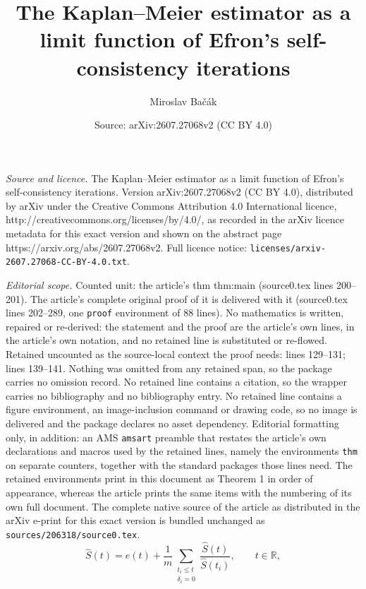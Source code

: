 \documentclass[10pt,a4paper]{amsart}
\title{The Kaplan--Meier estimator as a limit function of Efron's self-consistency iterations}
\author{Miroslav Ba\v{c}\'ak}
\date{Source: arXiv:2607.27068v2 (CC BY 4.0)}
\renewcommand{\hat}{\widehat}
\def\l{\left}
\def\r{\right}
\newcommand{\rec}[1]{\frac{1}{#1}}
\def\rls{\mathbb{R}}
\begin{document}
\maketitle

\noindent\emph{Source and licence.} The Kaplan--Meier estimator as a limit function of Efron's self-consistency iterations. Version arXiv:2607.27068v2 (CC BY 4.0), distributed by arXiv under the Creative Commons Attribution 4.0 International licence, http://creativecommons.org/licenses/by/4.0/, as recorded in the arXiv licence metadata for this exact version and shown on the abstract page https://arxiv.org/abs/2607.27068v2. Full licence notice: \texttt{licenses/arxiv-2607.27068-CC-BY-4.0.txt}.\par\smallskip

\noindent\textit{Editorial scope.} Counted unit: the article's thm thm:main (source0.tex lines 200--201). The article's complete original proof of it is delivered with it (source0.tex lines 202--289, one \texttt{proof} environment of 88 lines). No mathematics is written, repaired or re-derived: the statement and the proof are the article's own lines, in the article's own notation, and no retained line is substituted or re-flowed.  Retained uncounted as the source-local context the proof needs: lines 129--131; lines 139--141.  Nothing was omitted from any retained span, so the package carries no omission record.  No retained line contains a citation, so the wrapper carries no bibliography and no bibliography entry.  No retained line contains a figure environment, an image-inclusion command or drawing code, so no image is delivered and the package declares no asset dependency.  Editorial formatting only, in addition: an AMS \texttt{amsart} preamble that restates the article's own declarations and macros used by the retained lines, namely the environments \texttt{thm} on separate counters, together with the standard packages those lines need.  The retained environments print in this document as Theorem 1 in order of appearance, whereas the article prints the same items with the numbering of its own full document.  The complete native source of the article as distributed in the arXiv e-print for this exact version is bundled unchanged as \texttt{sources/206318/source0.tex}.
\begin{equation} \label{eq:self}
 \hat{S}(t) = e(t) + \rec{m} \sum_{\substack{t_i\le t \\ \delta_i=0}}\frac{\hat{S}(t)}{\hat{S}\l(t_i\r)},\qquad t\in\rls,
\end{equation}
\end{document}
